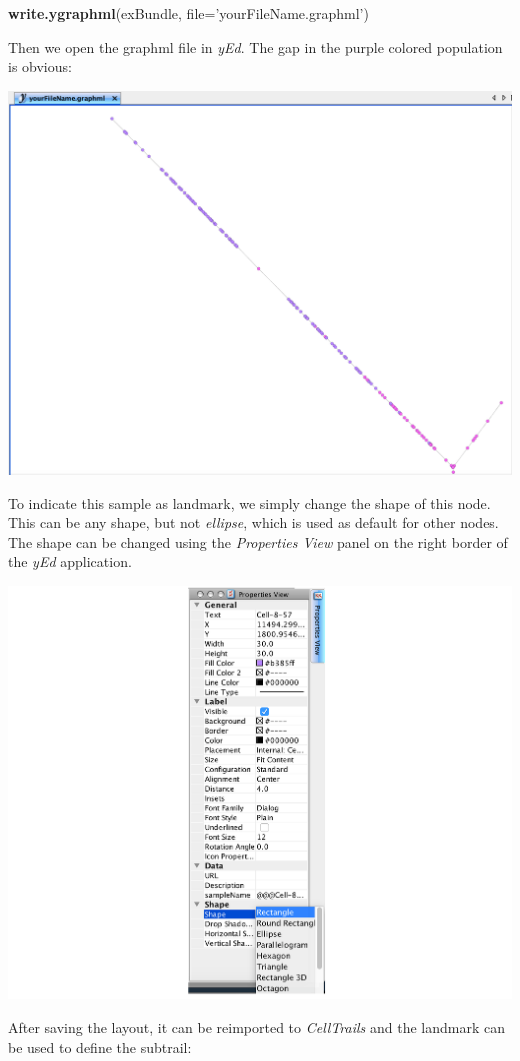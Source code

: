 \documentclass[]{book}
\newenvironment{Shaded}{\begin{snugshade}}{\end{snugshade}}
\newcommand{\KeywordTok}[1]{\textcolor[rgb]{0.13,0.29,0.53}{\textbf{#1}}}
\newcommand{\DataTypeTok}[1]{\textcolor[rgb]{0.13,0.29,0.53}{#1}}
\newcommand{\StringTok}[1]{\textcolor[rgb]{0.31,0.60,0.02}{#1}}
\newcommand{\NormalTok}[1]{#1}
\theoremstyle{definition}
\theoremstyle{definition}
\theoremstyle{definition}
\theoremstyle{remark}
\begin{document}
\begin{Shaded}
\begin{Highlighting}[]
\KeywordTok{write.ygraphml}\NormalTok{(exBundle, }\DataTypeTok{file=}\StringTok{'yourFileName.graphml'}\NormalTok{)}
\end{Highlighting}
\end{Shaded}

Then we open the graphml file in \emph{yEd}. The gap in the purple
colored population is obvious:

\includegraphics[width=0.7\linewidth]{img/yEd_7}

To indicate this sample as landmark, we simply change the shape of this
node. This can be any shape, but not \emph{ellipse}, which is used as
default for other nodes. The shape can be changed using the
\emph{Properties View} panel on the right border of the \emph{yEd}
application.

\includegraphics[width=0.7\linewidth]{img/yEd_8}

After saving the layout, it can be reimported to \emph{CellTrails} and
the landmark can be used to define the subtrail:
\end{document}

